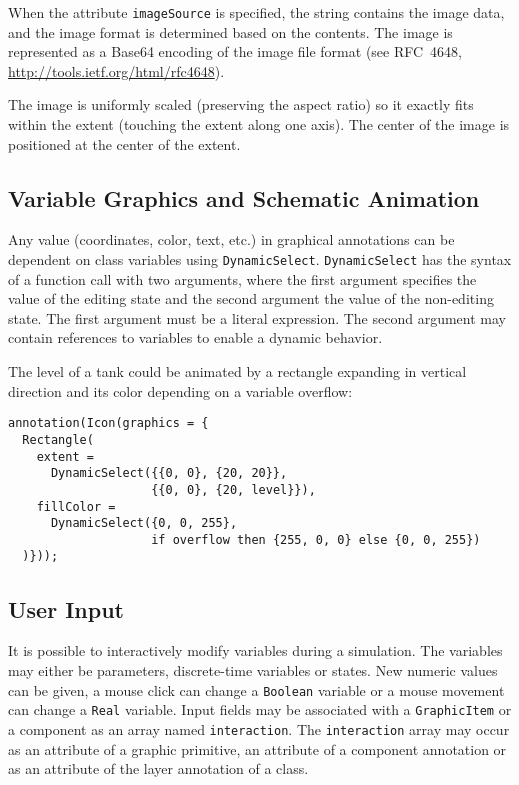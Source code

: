 When the attribute \lstinline!imageSource! is specified, the string contains the image data, and the image format is determined based on the contents.
The image is represented as a Base64 encoding of the image file format (see RFC~4648, \url{http://tools.ietf.org/html/rfc4648}).

The image is uniformly scaled (preserving the aspect ratio) so it exactly fits within the extent (touching the extent along one axis).
The center of the image is positioned at the center of the extent.

\subsection{Variable Graphics and Schematic Animation}\label{variable-graphics-and-schematic-animation}

Any value (coordinates, color, text, etc.) in graphical annotations can be dependent on class variables using \lstinline!DynamicSelect!.
\lstinline!DynamicSelect! has the syntax of a function call with two arguments, where the first argument specifies the value of the editing state and the second argument the value of the non-editing state.
The first argument must be a literal expression.
The second argument may contain references to variables to enable a dynamic behavior.

\begin{example}
The level of a tank could be animated by a rectangle expanding in vertical direction and its color depending on a variable overflow:
\begin{lstlisting}[language=modelica]
annotation(Icon(graphics = {
  Rectangle(
    extent =
      DynamicSelect({{0, 0}, {20, 20}},
                    {{0, 0}, {20, level}}),
    fillColor =
      DynamicSelect({0, 0, 255},
                    if overflow then {255, 0, 0} else {0, 0, 255})
  )}));
\end{lstlisting}
\end{example}

\subsection{User Input}\label{user-input}

It is possible to interactively modify variables during a simulation.
The variables may either be parameters, discrete-time variables or states.
New numeric values can be given, a mouse click can change a \lstinline!Boolean! variable or a mouse movement can change a \lstinline!Real! variable.
Input fields may be associated with a \lstinline!GraphicItem! or a component as an array named \lstinline!interaction!.
The \lstinline!interaction! array may occur as an attribute of a graphic primitive, an attribute of a component annotation or as an attribute of the layer annotation of a class.

